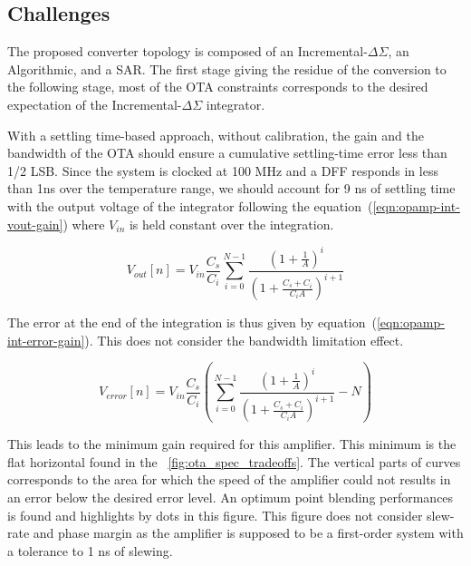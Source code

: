     \subsection{Challenges}                      %
The proposed converter topology is composed of an Incremental-\(\Delta\Sigma \), an Algorithmic, and a SAR\@. The first stage giving the residue of the conversion to the following stage, most of the OTA constraints corresponds to the desired expectation of the Incremental-\(\Delta\Sigma \) integrator.

With a settling time-based approach, without calibration, the gain and the bandwidth of the OTA should ensure a cumulative settling-time error less than 1/2 LSB\@. Since the system is clocked at 100 MHz and a DFF responds in less than 1ns over the temperature range, we should account for 9 ns of settling time with the output voltage of the integrator following the equation~(\ref{eqn:opamp-int-vout-gain}) where \(V_{in} \) is held constant over the integration.

\begin{equation}
\label{eqn:opamp-int-vout-gain}
V_{out}[n] = V_{in} \frac{C_s}{C_i}\sum_{i=0}^{N-1}\frac{{\left(1+\frac{1}{A} \right)}^i}{{\left(1+\frac{C_s+C_i}{C_i A} \right)}^{i+1}}
\end{equation}

The error at the end of the integration is thus given by equation~(\ref{eqn:opamp-int-error-gain}). This does not consider the bandwidth limitation effect.

\begin{equation}
\label{eqn:opamp-int-error-gain}
V_{error}[n] = V_{in} \frac{C_s}{C_i} \left( \sum_{i=0}^{N-1}\frac{{\left(1+\frac{1}{A} \right)}^i}{{\left(1+\frac{C_s+C_i}{C_i A} \right)}^{i+1}} - N \right)
\end{equation}

This leads to the minimum gain required for this amplifier. This minimum is the flat horizontal found in the \figurename~\ref{fig:ota_spec_tradeoffs}. The vertical parts of curves corresponds to the area for which the speed of the amplifier could not results in an error below the desired error level. An optimum point blending performances is found and highlights by dots in this figure. This figure does not consider slew-rate and phase margin as the amplifier is supposed to be a first-order system with a tolerance to 1 ns of slewing.

